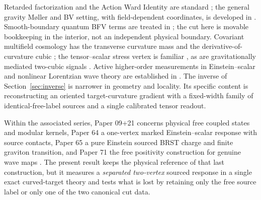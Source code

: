 \documentclass[11pt]{article}
\numberwithin{equation}{section}
\begin{document}
Retarded factorization and the Action Ward Identity are standard \cite{df}; the general gravity M\o ller and BV setting, with field-dependent coordinates, is developed in \cite{bfr}. Smooth-boundary quantum BFV terms are treated in \cite{rs}; the cut here is movable bookkeeping in the interior, not an independent physical boundary. Covariant multifield cosmology has the transverse curvature mass and the derivative-of-curvature cubic \cite[Sec.~4.2, Eqs.~(59) and (64)]{gong}; the tensor--scalar stress vertex is familiar \cite[Secs.~3--4]{mal}, as are gravitationally mediated two-cubic signals \cite{ssv}. Active higher-order measurements in Einstein--scalar and nonlinear Lorentzian wave theory are established in \cite{klou,klu}. The inverse of Section~\ref{sec:inverse} is narrower in geometry and locality. Its specific content is reconstructing an oriented target-curvature gradient with a fixed-width family of identical-free-label sources and a single calibrated tensor readout.

Within the associated series, Paper 09+21 concerns physical free coupled states and modular kernels, Paper 64 a one-vertex marked Einstein--scalar response with source contacts, Paper 65 a pure Einstein sourced BRST charge and finite graviton transition, and Paper 71 the free positivity construction for genuine wave maps \cite{p0921,p64,p65,p71}. The present result keeps the physical reference of that last construction, but it measures a \emph{separated two-vertex} sourced response in a single exact curved-target theory and tests what is lost by retaining only the free source label or only one of the two canonical cut data.
\end{document}
